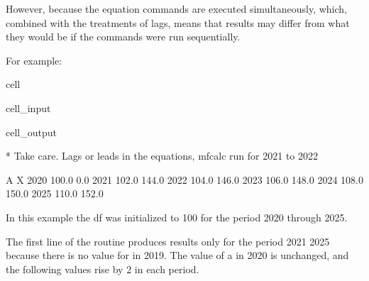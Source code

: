 \documentclass[letterpaper,10pt,english]{jupyterBook}
\begin{document}
\sphinxAtStartPar
However,  because the equation commands are executed simultaneously, which, combined with the treatments of lags, means that results may differ from what they would be if the commands were run sequentially.

\sphinxAtStartPar
For example:

\begin{sphinxuseclass}{cell}\begin{sphinxVerbatimInput}

\begin{sphinxuseclass}{cell_input}
\begin{sphinxVerbatim}[commandchars=\\\{\}]
  


\end{sphinxVerbatim}

\end{sphinxuseclass}\end{sphinxVerbatimInput}
\begin{sphinxVerbatimOutput}

\begin{sphinxuseclass}{cell_output}
\begin{sphinxVerbatim}[commandchars=\\\{\}]
* Take care. Lags or leads in the equations, mfcalc run for 2021 to 2022
\end{sphinxVerbatim}

\begin{sphinxVerbatim}[commandchars=\\\{\}]
          A      X
2020  100.0    0.0
2021  102.0  144.0
2022  104.0  146.0
2023  106.0  148.0
2024  108.0  150.0
2025  110.0  152.0
\end{sphinxVerbatim}

\end{sphinxuseclass}\end{sphinxVerbatimOutput}

\end{sphinxuseclass}
\sphinxAtStartPar
In this example the  df was initialized to 100 for the period 2020 through 2025.

\sphinxAtStartPar
The first line of the  routine produces results only for the period 2021 \sphinxhyphen{} 2025 because there is no value for  in 2019.  The value of a in 2020 is unchanged, and the following values rise by 2 in each period.
\end{document}
